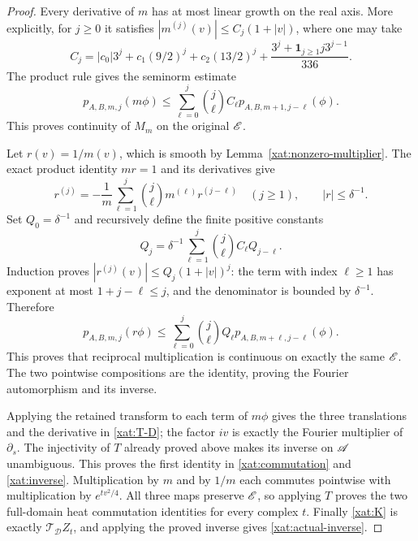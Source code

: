 \begin{proof}
Every derivative of \(m\) has at most linear growth on the real
axis. More explicitly, for \(j\geq0\) it satisfies
\( |m^{(j)}(v)|\leq C_j(1+|v|)\), where one may take
\[
C_j=|c_0|3^j+c_1(9/2)^j+c_2(13/2)^j
       +\frac{3^j+\mathbf1_{j\geq1}j3^{j-1}}{336}.
\]
The product rule gives the seminorm estimate
\[
p_{A,B,m,j}(m\phi)
 \leq\sum_{\ell=0}^j\binom j\ell C_\ell
                     p_{A,B,m+1,j-\ell}(\phi).
\]
This proves continuity of \(M_m\) on the original \(\mathscr E\).

Let \(r(v)=1/m(v)\), which is smooth by
Lemma~\ref{xat:nonzero-multiplier}. The exact product identity
\(mr=1\) and its derivatives give
\[
r^{(j)}=-\frac1m\sum_{\ell=1}^j
                 \binom j\ell m^{(\ell)}r^{(j-\ell)}
\quad(j\geq1),\qquad |r|\leq\delta^{-1}.
\]
Set \(Q_0=\delta^{-1}\) and recursively define the finite
positive constants
\[
Q_j=\delta^{-1}\sum_{\ell=1}^j
                      \binom j\ell C_\ell Q_{j-\ell}.
\]
Induction proves
\(|r^{(j)}(v)|\leq Q_j(1+|v|)^j\): the term with index
\(\ell\geq1\) has exponent at most
\(1+j-\ell\leq j\), and the denominator is bounded by
\(\delta^{-1}\). Therefore
\[
p_{A,B,m,j}(r\phi)
 \leq\sum_{\ell=0}^j\binom j\ell Q_\ell
                         p_{A,B,m+\ell,j-\ell}(\phi).
\]
This proves that reciprocal multiplication is continuous on
exactly the same \(\mathscr E\). The two pointwise compositions are
the identity, proving the Fourier automorphism and its inverse.

Applying the retained transform to each term of \(m\phi\)
gives the three translations and the derivative in
\eqref{xat:T-D}; the factor \(iv\) is exactly the Fourier
multiplier of \(\partial_s\). The injectivity of \(T\) already
proved above makes its inverse on \(\mathscr A\) unambiguous. This
proves the first identity in \eqref{xat:commutation} and
\eqref{xat:inverse}. Multiplication by \(m\) and by \(1/m\)
each commutes pointwise with multiplication by
\(e^{tv^2/4}\). All three maps preserve \(\mathscr E\), so applying
\(T\) proves the two full-domain heat commutation identities
for every complex \(t\). Finally \eqref{xat:K} is exactly
\(\mathcal T_{\mathcal D}Z_t\), and applying the proved inverse
gives \eqref{xat:actual-inverse}.
\end{proof}

